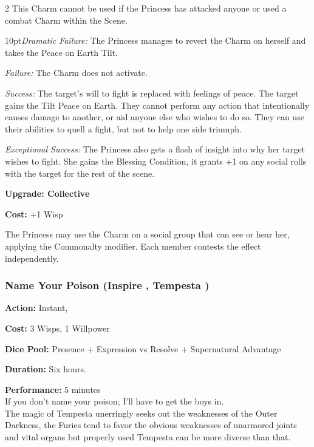 \begin{multicols}{2}
This Charm cannot be used if the Princess has attacked anyone or used a combat Charm within the Scene.

   \begin{myindentpar}{10pt}\emph{Dramatic Failure:} The Princess manages to revert the Charm on herself and takes the Peace on Earth Tilt.

    \emph{Failure:} The Charm does not activate.

    \emph{Success:} The target's will to fight is replaced with feelings of peace. The target gains the Tilt Peace on Earth. They cannot perform any action that intentionally causes damage to another, or aid anyone else who wishes to do so. They can use their abilities to quell a fight, but not to help one side triumph. 

    \emph{Exceptional Success:} The Princess also gets a flash of insight into why her target wishes to fight. She gains the Blessing Condition, it grants +1 on any social rolls with the target for the rest of the scene.

\textbf{Upgrade: Collective}

\noindent \textbf{Cost:} +1 Wisp

The Princess may use the Charm on a social group that can see or hear her, applying the Commonalty modifier. Each member contests the effect independently.\end{myindentpar}

\subsubsection*{Name Your Poison (Inspire \textbullet\textbullet\textbullet, Tempesta \textbullet\textbullet\textbullet)}

\noindent \textbf{Action:} Instant, 

\noindent \textbf{Cost:} 3 Wisps, 1 Willpower

\noindent \textbf{Dice Pool:} Presence + Expression vs Resolve + Supernatural Advantage

\noindent \textbf{Duration:} Six hours.

\noindent \textbf{Performance:} 5 minutes \\

\noindent If you don't name your poison; I'll have to get the boys in.\\

\noindent The magic of Tempesta unerringly seeks out the weaknesses of the Outer Darkness, the Furies tend to favor the obvious weaknesses of unarmored joints and vital organs but properly used Tempesta can be more diverse than that.


\end{multicols}
